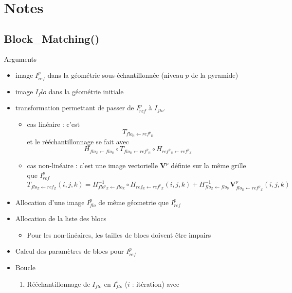 \documentclass[10pt]{report}
\newcommand{\ens}[4]{ {#1}_{\mathbb{#2}} \leftarrow {#3}_{\mathbb{#4}} }
\begin{document}
\section{Notes}



\subsection{Block\_Matching()}

Arguments
\begin{itemize}
\item image $I^p_{ref}$ dans la g\'eom\'etrie sous-\'echantillonn\'ee (niveau $p$ de la pyramide)
\item image $I_flo$ dans la g\'eom\'etrie initiale
\item transformation permettant de passer de $I^p_{ref}$ \`a  $I_{flo}$.
\begin{itemize}
\item cas lin\'eaire : c'est 
$$ 
T_{\ens{flo}{R}{ref^p}{R}}
$$
et le r\'e\'echantillonnage se fait avec 
$$ 
H_{\ens{flo}{Z}{flo}{R}} \circ
T_{\ens{flo}{R}{ref^p}{R}} \circ 
H_{\ens{ref^p}{R}{ref^p}{Z}}
$$
\item cas non-lin\'eaire : c'est une image vectorielle $\mathbf{V}^p$ d\'efinie sur la m\^eme grille que $I^p_{ref}$
$$
T_{\ens{flo}{Z}{ref}{Z}}(i,j,k) = 
H^{-1}_{\ens{flo^p}{Z}{flo}{R}}  \circ H_{\ens{ref}{R}{ref^p}{Z}} (i,j,k) 
+ H^{-1}_{\ens{flo}{Z}{flo}{R}}  \mathbf{V}^p_{\ens{flo}{R}{ref^p}{Z}} (i,j,k)
$$
\end{itemize}


\item Allocation d'une image $I^p_{flo}$ de m\^eme g\'eometrie que $I^p_{ref}$
\item Allocation de la liste des blocs 
\begin{itemize}
\item Pour les non-lin\'eaires, les tailles de blocs doivent \^etre impairs
\end{itemize}
\item Calcul des param\`etres de blocs pour $I^p_{ref}$

\item Boucle




\begin{enumerate}

\item R\'e\'echantillonnage de $I_{flo}$ en $I^i_{flo}$ ($i$ : it\'eration) avec 


\end{enumerate}
\end{itemize}
\end{document}
